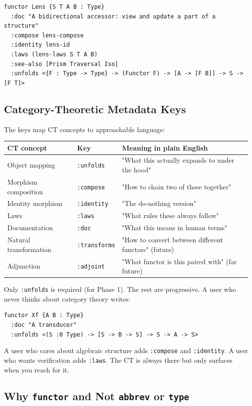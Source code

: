 \documentclass[11pt]{article}
\begin{document}
\begin{verbatim}
functor Lens {S T A B : Type}
  :doc "A bidirectional accessor: view and update a part of a structure"
  :compose lens-compose
  :identity lens-id
  :laws (lens-laws S T A B)
  :see-also [Prism Traversal Iso]
  :unfolds <{F : Type -> Type} -> (Functor F) -> [A -> [F B]] -> S -> [F T]>
\end{verbatim}
\subsection{Category-Theoretic Metadata Keys}
\label{sec:orgf638b8b}

The keys map CT concepts to approachable language:

\begin{center}
\begin{tabular}{lll}
CT concept & Key & Meaning in plain English\\
\hline
Object mapping & \texttt{:unfolds} & "What this actually expands to under the hood"\\
Morphism composition & \texttt{:compose} & "How to chain two of these together"\\
Identity morphism & \texttt{:identity} & "The do-nothing version"\\
Laws & \texttt{:laws} & "What rules these always follow"\\
Documentation & \texttt{:doc} & "What this means in human terms"\\
Natural transformation & \texttt{:transforms} & "How to convert between different functors" (future)\\
Adjunction & \texttt{:adjoint} & "What functor is this paired with" (far future)\\
\end{tabular}
\end{center}

Only \texttt{:unfolds} is required (for Phase 1). The rest are progressive. A user
who never thinks about category theory writes:

\begin{verbatim}
functor Xf {A B : Type}
  :doc "A transducer"
  :unfolds <(S :0 Type) -> [S -> B -> S] -> S -> A -> S>
\end{verbatim}

A user who cares about algebraic structure adds \texttt{:compose} and \texttt{:identity}. A
user who wants verification adds \texttt{:laws}. The CT is always there but only
surfaces when you reach for it.
\subsection{Why \texttt{functor} and Not \texttt{abbrev} or \texttt{type}}
\label{sec:org026124d}
\end{document}
